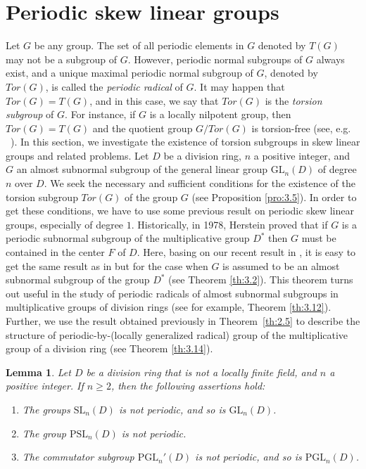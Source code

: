 \documentclass{amsart}
\newtheorem{lemma}[theorem]{Lemma}
\theoremstyle{definition}
\begin{document}
\section{Periodic skew linear groups}\label{S3}
Let $G$ be any group. The set of all periodic elements in $G$ denoted by $T(G)$ may not be a subgroup of $G$. However, periodic normal subgroups of $G$ always exist, and a unique maximal periodic normal subgroup of $G$, denoted by $Tor(G)$, is called the \textit{periodic radical} of $G$. It may happen that $Tor(G)=T(G)$, and in this case, we say that $\mathit{Tor}(G)$ is the \textit{torsion subgroup} of $G.$ For instance, if $G$ is a locally nilpotent group, then $\mathit{Tor}(G)=T(G)$ and the quotient group $G/\mathit{Tor}(G)$ is torsion-free (see, e.g. ~\cite[Proposition 1.2.11]{Bo_Dixon_2017}). In this section, we investigate the existence of torsion subgroups in skew linear groups and related problems. Let $D$ be a division ring, $n$ a positive integer, and $G$ an almost subnormal subgroup of the general linear group $\mathrm{GL}_n(D)$ of degree $n$ over $D$. We seek the necessary and sufficient conditions for the existence of the torsion subgroup $Tor(G)$ of the group $G$ (see Proposition \ref{pro:3.5}). In order to get these conditions, we have to use some previous result on periodic skew linear groups, especially of degree $1$.  Historically, in 1978, Herstein \cite[Theorem~8]{Pa_Herstein_1978} proved that if $G$ is a periodic subnormal subgroup of the multiplicative group $D^*$ then $G$ must be contained in the center $F$ of $D$. Here, basing on our recent result in \cite[Theorem 2.1]{Pa_ChNaHa_24}, it is easy to get the same result as in \cite[Theorem~8]{Pa_Herstein_1978} but for the case when $G$ is assumed to be an almost subnormal subgroup of the group $D^*$ (see Theorem \ref{th:3.2}). This theorem turns out useful in the study of periodic radicals of almost subnormal subgroups in multiplicative groups of division rings (see for example, Theorem \ref{th:3.12}). Further, we use the result obtained previously in 
Theorem~\ref{th:2.5} to describe the structure of 
periodic-by-(locally generalized radical) group of the multiplicative group of a division ring (see Theorem \ref{th:3.14}).
\begin{lemma}\label{lem:3.1} Let $D$ be a division ring that is not a locally finite field, and $n$ a positive integer. If $n\geq 2$, then the following assertions hold:
	\begin{enumerate}
		\rm\item\textit{The groups $\mathrm{SL}_n(D)$ is not periodic, and so is $\mathrm{GL}_n(D)$.}
		\item\textit{The group $\mathrm{PSL}_n(D)$ is not periodic.}
		\item\textit{The commutator subgroup $\mathrm{PGL}_n'(D)$ is not periodic, and so is $\mathrm{PGL}_n(D)$.}
	\end{enumerate}	
\end{lemma}
\end{document}
